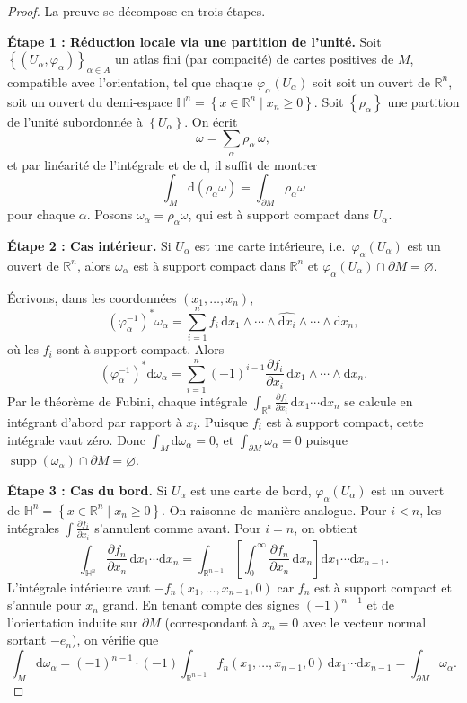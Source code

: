 \documentclass[12pt,a4paper,openany]{book}
\theoremstyle{definition}
\theoremstyle{plain}
\theoremstyle{remark}
\newcommand{\R}{\mathbb{R}}
\newcommand{\dd}{\mathrm{d}}
\newcommand{\set}[1]{\left\{#1\right\}}
\begin{document}
\begin{proof}
La preuve se décompose en trois étapes.

\medskip\noindent\textbf{Étape 1 : Réduction locale via une partition de l'unité.}
Soit $\set{(U_\alpha, \varphi_\alpha)}_{\alpha \in A}$ un atlas fini (par
compacité) de cartes positives de $M$, compatible avec l'orientation, tel que
chaque $\varphi_\alpha(U_\alpha)$ soit soit un ouvert de $\R^n$, soit un ouvert
du demi-espace $\mathbb{H}^n = \set{x \in \R^n \mid x_n \geq 0}$. Soit
$\set{\rho_\alpha}$ une partition de l'unité subordonnée à $\set{U_\alpha}$.
On écrit
\[
  \omega = \sum_\alpha \rho_\alpha \, \omega,
\]
et par linéarité de l'intégrale et de $\dd$, il suffit de montrer
\[
  \int_M \dd(\rho_\alpha \omega) = \int_{\partial M} \rho_\alpha \omega
\]
pour chaque $\alpha$. Posons $\omega_\alpha = \rho_\alpha \omega$, qui est à
support compact dans $U_\alpha$.

\medskip\noindent\textbf{Étape 2 : Cas intérieur.}
Si $U_\alpha$ est une carte intérieure, i.e.\ $\varphi_\alpha(U_\alpha)$ est
un ouvert de $\R^n$, alors $\omega_\alpha$ est à support compact dans $\R^n$
et $\varphi_\alpha(U_\alpha) \cap \partial M = \varnothing$.

Écrivons, dans les coordonnées $(x_1, \dots, x_n)$,
\[
  (\varphi_\alpha^{-1})^*\omega_\alpha
  = \sum_{i=1}^{n} f_i \, \dd x_1 \wedge \cdots \wedge \widehat{\dd x_i}
    \wedge \cdots \wedge \dd x_n,
\]
où les $f_i$ sont à support compact. Alors
\[
  (\varphi_\alpha^{-1})^*\dd\omega_\alpha
  = \sum_{i=1}^{n} (-1)^{i-1} \frac{\partial f_i}{\partial x_i}
    \, \dd x_1 \wedge \cdots \wedge \dd x_n.
\]
Par le théorème de Fubini, chaque intégrale
$\int_{\R^n} \frac{\partial f_i}{\partial x_i}\, \dd x_1 \cdots \dd x_n$
se calcule en intégrant d'abord par rapport à $x_i$. Puisque $f_i$ est à
support compact, cette intégrale vaut zéro. Donc
$\int_M \dd\omega_\alpha = 0$, et $\int_{\partial M} \omega_\alpha = 0$
puisque $\operatorname{supp}(\omega_\alpha) \cap \partial M = \varnothing$.

\medskip\noindent\textbf{Étape 3 : Cas du bord.}
Si $U_\alpha$ est une carte de bord, $\varphi_\alpha(U_\alpha)$ est un ouvert
de $\mathbb{H}^n = \set{x \in \R^n \mid x_n \geq 0}$. On raisonne de manière
analogue. Pour $i < n$, les intégrales
$\int \frac{\partial f_i}{\partial x_i}$ s'annulent comme avant. Pour $i = n$,
on obtient
\[
  \int_{\mathbb{H}^n} \frac{\partial f_n}{\partial x_n}
  \, \dd x_1 \cdots \dd x_n
  = \int_{\R^{n-1}} \left[\int_0^\infty \frac{\partial f_n}{\partial x_n}
    \, \dd x_n \right] \dd x_1 \cdots \dd x_{n-1}.
\]
L'intégrale intérieure vaut $-f_n(x_1, \dots, x_{n-1}, 0)$ car $f_n$ est à
support compact et s'annule pour $x_n$ grand. En tenant compte des signes
$(-1)^{n-1}$ et de l'orientation induite sur $\partial M$ (correspondant à
$x_n = 0$ avec le vecteur normal sortant $-e_n$), on vérifie que
\[
  \int_M \dd\omega_\alpha
  = (-1)^{n-1} \cdot (-1) \int_{\R^{n-1}} f_n(x_1,\dots,x_{n-1},0)
    \, \dd x_1 \cdots \dd x_{n-1}
  = \int_{\partial M} \omega_\alpha.
\]


\end{proof}
\end{document}
